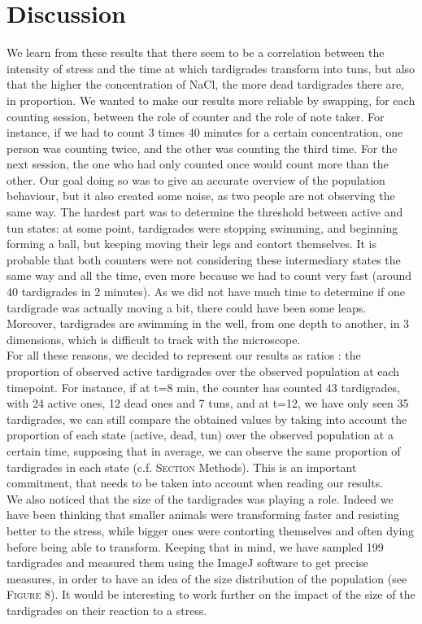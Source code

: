 \documentclass[12pt,a4paper, twocolumn]{article}
\begin{document}
\section{Discussion}
We learn from these results that there seem to be a correlation between the intensity of stress and the time at which tardigrades transform into tuns, but also that the higher the concentration of NaCl, the more dead tardigrades there are, in proportion. We wanted to make our results more reliable by swapping, for each counting session, between the role of counter and the role of note taker. For instance, if we had to count 3 times 40 minutes for a certain concentration, one person was counting twice, and the other was counting the third time. For the next session, the one who had only counted once would count more than the other. Our goal doing so was to give an accurate overview of the population behaviour, but it also created some noise, as two people are not observing the same way. The hardest part was to determine the threshold between active and tun states: at some point, tardigrades were stopping swimming, and beginning forming a ball, but keeping moving their legs and contort themselves. It is probable that both counters were not considering these intermediary states the same way and all the time, even more because we had to count very fast (around 40 tardigrades in 2 minutes). As we did not have much time to determine if one tardigrade was actually moving a bit, there could have been some leaps. Moreover, tardigrades are swimming in the well, from one depth to another, in 3 dimensions, which is difficult to track with the microscope.\\

For all these reasons, we decided to represent our results as ratios : the proportion of observed active tardigrades over the observed population at each timepoint. For instance, if at t=8 min, the counter has counted 43 tardigrades, with 24 active ones, 12 dead ones and 7 tuns, and at t=12, we have only seen 35 tardigrades, we can still compare the obtained values by taking into account the proportion of each state (active, dead, tun) over the observed population at a certain time, supposing that in average, we can observe the same proportion of tardigrades in each state (c.f. \textsc{Section} Methods). This is an important commitment, that needs to be taken into account when reading our results.\\

We also noticed that the size of the tardigrades was playing a role. Indeed we have been thinking that smaller animals were transforming faster and resisting better to the stress, while bigger ones were contorting themselves and often dying before being able to transform. Keeping that in mind, we have sampled 199 tardigrades and measured them using the ImageJ software to get precise measures, in order to have an idea of the size distribution of the population (see \textsc{Figure} 8). It would be interesting to work further on the impact of the size of the tardigrades on their reaction to a stress.\\
\end{document}
